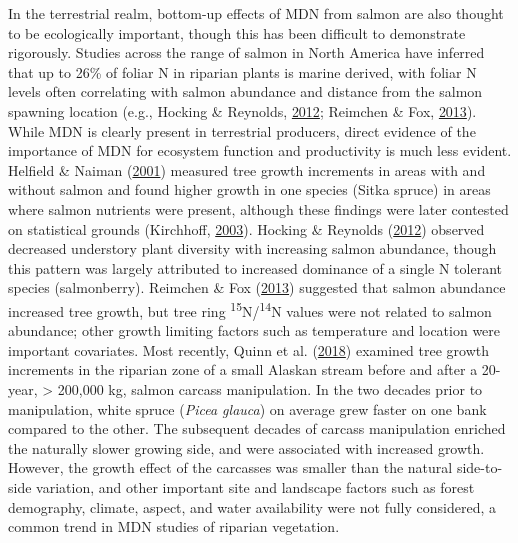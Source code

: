 \documentclass [11pt, proquest] {uwthesis}[2015/03/03]
\begin{document}
In the terrestrial realm, bottom-up effects of MDN from salmon are also
thought to be ecologically important, though this has been difficult to
demonstrate rigorously. Studies across the range of salmon in North
America have inferred that up to 26\% of foliar N in riparian plants is
marine derived, with foliar N levels often correlating with salmon
abundance and distance from the salmon spawning location (e.g., Hocking
\& Reynolds, \protect\hyperlink{ref-Hocking2012}{2012}; Reimchen \& Fox,
\protect\hyperlink{ref-Reimchen2013}{2013}). While MDN is clearly
present in terrestrial producers, direct evidence of the importance of
MDN for ecosystem function and productivity is much less evident.
Helfield \& Naiman (\protect\hyperlink{ref-Helfield2001}{2001}) measured
tree growth increments in areas with and without salmon and found higher
growth in one species (Sitka spruce) in areas where salmon nutrients
were present, although these findings were later contested on
statistical grounds (Kirchhoff,
\protect\hyperlink{ref-Kirchoff2003}{2003}). Hocking \& Reynolds
(\protect\hyperlink{ref-Hocking2012}{2012}) observed decreased
understory plant diversity with increasing salmon abundance, though this
pattern was largely attributed to increased dominance of a single N
tolerant species (salmonberry). Reimchen \& Fox
(\protect\hyperlink{ref-Reimchen2013}{2013}) suggested that salmon
abundance increased tree growth, but tree ring
\textsuperscript{15}N/\textsuperscript{14}N values were not related to
salmon abundance; other growth limiting factors such as temperature and
location were important covariates. Most recently, Quinn et al.
(\protect\hyperlink{ref-Quinn2018}{2018}) examined tree growth
increments in the riparian zone of a small Alaskan stream before and
after a 20-year, \textgreater{} 200,000 kg, salmon carcass manipulation.
In the two decades prior to manipulation, white spruce (\emph{Picea
glauca}) on average grew faster on one bank compared to the other. The
subsequent decades of carcass manipulation enriched the naturally slower
growing side, and were associated with increased growth. However, the
growth effect of the carcasses was smaller than the natural side-to-side
variation, and other important site and landscape factors such as forest
demography, climate, aspect, and water availability were not fully
considered, a common trend in MDN studies of riparian vegetation.
\end{document}
